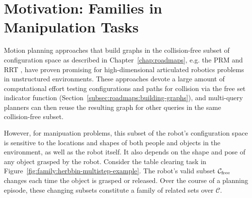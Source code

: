 

%

\section{Motivation: Families in Manipulation Tasks}
\label{sec:family:families-in-manipulation}

Motion planning approaches that build graphs
in the collision-free subset of
configuration space as described in Chapter~\ref{chap:roadmaps},
e.g. the
PRM \citep{kavrakietal1996prm}
and RRT \citep{lavallekuffner1999rrt},
have proven promising
for high-dimensional articulated robotics problems
in unstructured environments.
These approaches devote a large amount of computational effort
testing configurations and paths for collision
via the free set indicator function
(Section~\ref{subsec:roadmaps:building-graphs}),
and multi-query planners can then reuse the resulting graph
for other queries in the same collision-free subset.

However,
for manipuation problems,
this subset of the robot's configuration space
is sensitive to the locations and shapes of
both people and objects in the environment,
as well as the robot itself.
It also depends on the shape and pose of any object
grasped by the robot.
Consider the table clearing task in
Figure~\ref{fig:family:herbbin-multistep-example}.
The robot's valid subset $\mathcal{C}_{\mbox{\scriptsize free}}$
changes each time the object is grasped or released.
Over the course of a planning episode,
these changing subsets constitute a family of related sets over
$\mathcal{C}$.

